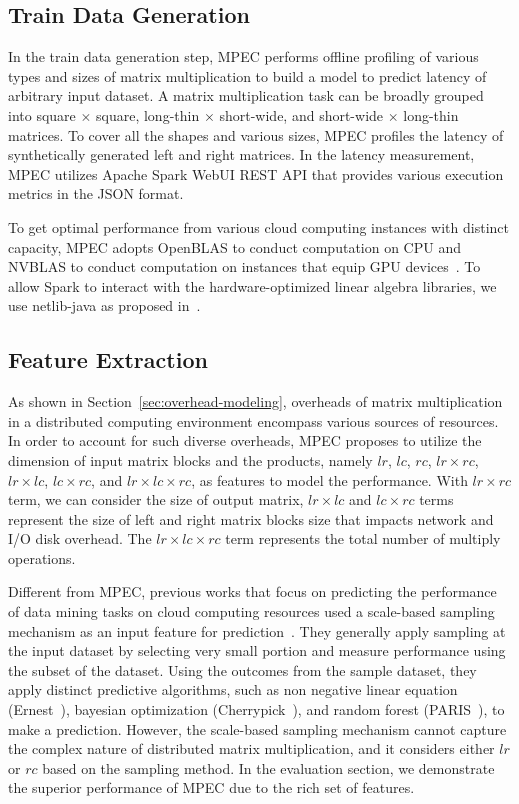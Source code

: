 \documentclass[10pt, conference, compsocconf]{IEEEtran}
\begin{document}
\subsection{Train Data Generation}\label{sec:train-data}
In the train data generation step, MPEC performs offline profiling of various types and sizes of matrix multiplication to build a model to predict latency of arbitrary input dataset. A matrix multiplication task can be broadly grouped into square $\times$ square, long-thin $\times$ short-wide, and short-wide $\times$ long-thin matrices. To cover all the shapes and various sizes, MPEC profiles the latency of synthetically generated left and right matrices. In the latency measurement, MPEC utilizes Apache Spark WebUI REST API that provides various execution metrics in the JSON format.

To get optimal performance from various cloud computing instances with distinct capacity, MPEC adopts OpenBLAS to conduct computation on CPU and NVBLAS to conduct computation on instances that equip GPU devices~\cite{NVBLAS}. To allow Spark to interact with the hardware-optimized linear algebra libraries, we use netlib-java as proposed in~\cite{fatman-littleboy}.

\subsection{Feature Extraction}\label{sec:features}
As shown in Section~\ref{sec:overhead-modeling}, overheads of matrix multiplication in a distributed computing environment encompass various sources of resources. In order to account for such diverse overheads, MPEC proposes to utilize the dimension of input matrix blocks and the products, namely $lr$, $lc$, $rc$, $lr \times rc$, $lr \times lc$, $lc \times rc$, and $lr \times lc \times rc$, as features to model the performance. With $lr \times rc$ term, we can consider the size of output matrix, $lr \times lc$ and $lc \times rc$ terms represent the size of left and right matrix blocks size that impacts network and I/O disk overhead. The $lr \times lc \times rc$ term represents the total number of multiply operations.

Different from MPEC, previous works that focus on predicting the performance of data mining tasks on cloud computing resources used a scale-based sampling mechanism as an input feature for prediction~\cite{ernest, cherrypick, paris}. They generally apply sampling at the input dataset by selecting very small portion and measure performance using the subset of the dataset. Using the outcomes from the sample dataset, they apply distinct predictive algorithms, such as non negative linear equation (Ernest~\cite{ernest}), bayesian optimization (Cherrypick~\cite{cherrypick}), and random forest (PARIS~\cite{paris}), to make a prediction. However, the scale-based sampling mechanism cannot capture the complex nature of distributed matrix multiplication, and it considers either $lr$ or $rc$ based on the sampling method. In the evaluation section, we demonstrate the superior performance of MPEC due to the rich set of features.
\end{document}
